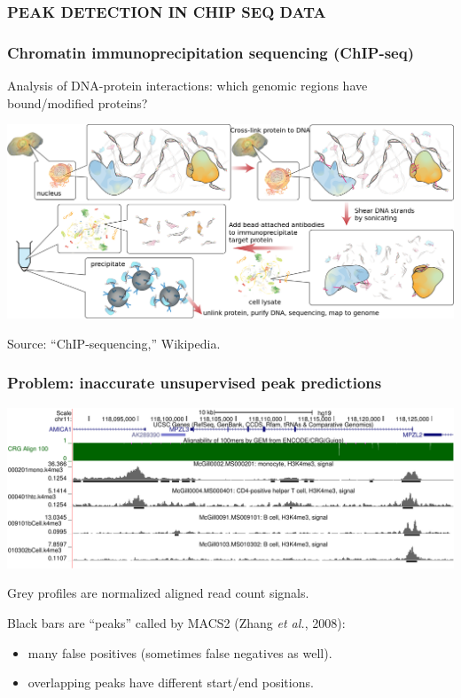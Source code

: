 \documentclass{beamer}
\begin{document}
\begin{frame}
  \frametitle{PEAK DETECTION IN CHIP SEQ DATA}
  
\end{frame}

\begin{frame}
  \frametitle{Chromatin immunoprecipitation sequencing (ChIP-seq)}
  Analysis of DNA-protein interactions: which genomic regions have
  bound/modified proteins?

  \includegraphics[width=\textwidth]{Chromatin_immunoprecipitation_sequencing_wide.png}

  Source: ``ChIP-sequencing,'' Wikipedia.
\end{frame}

\begin{frame}
  \frametitle{Problem: inaccurate unsupervised peak predictions}
  \includegraphics[width=\textwidth]{screenshot-ucsc-edited}

  Grey profiles are normalized aligned read count signals.

  Black bars are ``peaks'' called by MACS2 (Zhang {\it et al.}, 2008):
  \begin{itemize}
  \item many false positives (sometimes false negatives as well).
  \item overlapping peaks have different start/end positions.
  \end{itemize}
\end{frame}
\end{document}

